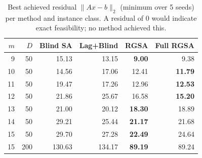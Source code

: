 \begin{table}[t]
\centering
\caption{Best achieved residual $\|Ax-b\|_2$ (minimum over 5 seeds) per method and instance class.  A residual of 0 would indicate exact feasibility; no method achieved this.}
\label{tab:best-residuals}
\small
\begin{tabular}{rr|rrrr}
\toprule
$m$ & $D$ & Blind SA & Lag+Blind & RGSA & Full RGSA \\
\midrule
9 & 50 & 15.13 & 13.15 & \textbf{9.00} & 9.38 \\
10 & 50 & 14.56 & 17.06 & 12.41 & \textbf{11.79} \\
11 & 50 & 19.47 & 17.26 & 12.96 & \textbf{12.53} \\
12 & 50 & 21.86 & 25.67 & 16.58 & \textbf{15.20} \\
13 & 50 & 21.00 & 20.12 & \textbf{18.30} & 18.89 \\
14 & 50 & 29.21 & 25.44 & \textbf{21.17} & 21.68 \\
15 & 50 & 29.70 & 27.28 & \textbf{22.49} & 24.64 \\
15 & 200 & 130.63 & 134.17 & \textbf{89.19} & 89.24 \\
\bottomrule
\end{tabular}
\end{table}
